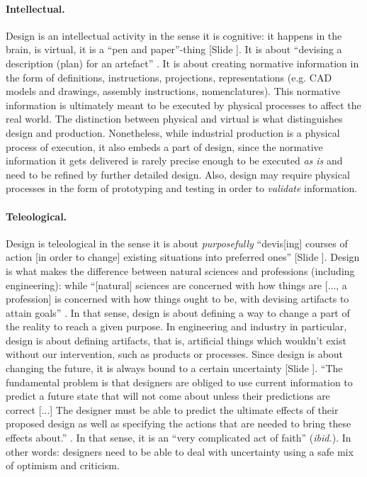 \documentclass{article}
\newcounter{slide}
\begin{document}
\paragraph{Intellectual.} Design is an intellectual activity in the sense it is cognitive: it happens in the brain, is virtual, it is a ``pen and paper''-thing {\color{blue}[Slide ]}. It is about ``devising a description (plan) for an artefact'' \cite{hybsEvolutionaryProcessModel1992}. It is about creating normative information in the form of definitions, instructions, projections, representations (e.g. CAD models and drawings, assembly instructions, nomenclatures). This normative information is ultimately meant to be executed by physical processes to affect the real world. The distinction between physical and virtual is what distinguishes design and production. Nonetheless, while industrial production is a physical process of execution, it also embeds a part of design, since the normative information it gets delivered is rarely precise enough to be executed \emph{as is} and need to be refined by further detailed design. Also, design may require physical processes in the form of prototyping and testing in order to \emph{validate} information.

\paragraph{Teleological.} Design is teleological in the sense it is about \emph{purposefully} ``devis[ing] courses of action [in order to change] existing situations into preferred ones'' {\color{blue}[Slide ]}\cite[p. 111]{simon1996sciences}. Design is what makes the difference between natural sciences and professions (including engineering): while ``[natural] sciences are concerned with how things are [..., a profession] is concerned with how things ought to be, with devising artifacts to attain goals'' \cite[p. 114]{simon1996sciences}. In that sense, design is about defining a way to change a part of the reality to reach a given purpose. In engineering and industry in particular, design is about defining artifacts, that is, artificial things which wouldn't exist without our intervention, such as products or processes. Since design is about changing the future, it is always bound to a certain uncertainty {\color{blue}[Slide ]}. ``The fundamental problem is that designers are obliged to use current information to predict a future state that will not come about unless their predictions are correct [...] The designer must be able to predict the ultimate effects of their proposed design as well as specifying the actions that are needed to bring these effects about.'' \cite{jonesDesignMethods1992}. In that sense, it is an ``very complicated act of faith'' (\emph{ibid.}). In other words: designers need to be able to deal with uncertainty using a safe mix of optimism and criticism.
\end{document}
